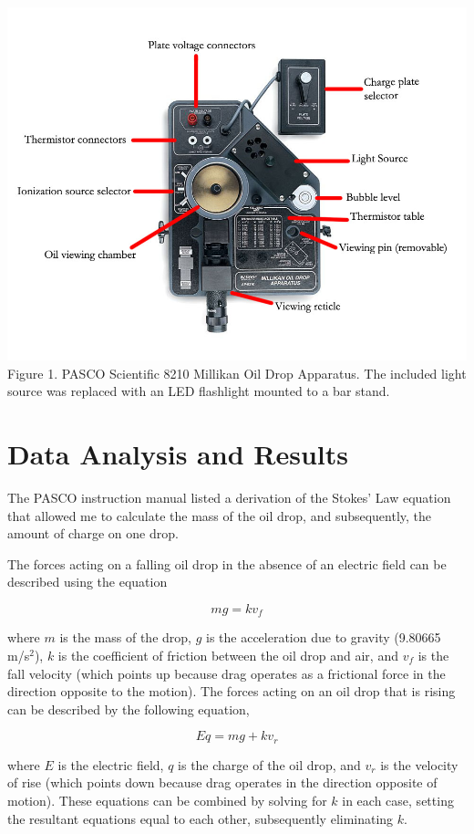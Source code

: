 \documentclass[11pt, oneside]{article}   	%
\begin{document}
\includegraphics{fig1}
Figure 1. PASCO Scientific 8210 Millikan Oil Drop Apparatus. The included light source was replaced with an LED flashlight mounted to a bar stand.
\section{Data Analysis and Results}
	The PASCO instruction manual listed a derivation of the Stokes' Law equation that allowed me to calculate the mass of the oil drop, and subsequently, the amount of charge on one drop. 

The forces acting on a falling oil drop in the absence of an electric field can be described using the equation

\begin{equation}
mg=kv_{f}
\end{equation}

\noindent where $m$ is the mass of the drop, $g$ is the acceleration due to gravity (9.80665 m/s$^2$),  $k$ is the coefficient of friction between the oil drop and air, and $v_{f}$ is the fall velocity (which points up because drag operates as a frictional force in the direction opposite to the motion). The forces acting on an oil drop that is rising can be described by the following equation,

\begin{equation}
Eq=mg+kv_{r}
\end{equation}

\noindent where $E$ is the electric field, $q$ is the charge of the oil drop, and $v_{r}$ is the velocity of rise (which points down because drag operates in the direction opposite of motion). These equations can be combined by solving for $k$ in each case, setting the resultant equations equal to each other, subsequently eliminating $k$.
\end{document}
